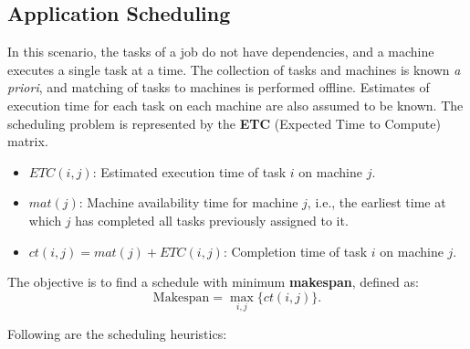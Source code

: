 \documentclass[12pt]{book}
\begin{document}
\subsection{Application Scheduling}
In this scenario, the tasks of a job do not have dependencies, and a machine executes a single task at a time. 
The collection of tasks and machines is known \emph{a priori}, and matching of tasks to machines is performed offline. 
Estimates of execution time for each task on each machine are also assumed to be known. 
The scheduling problem is represented by the \textbf{ETC} (Expected Time to Compute) matrix.  

\begin{itemize}
    \item $ETC(i,j)$: Estimated execution time of task $i$ on machine $j$.
    \item $mat(j)$: Machine availability time for machine $j$, i.e., the earliest time at which $j$ has completed all tasks previously assigned to it.
    \item $ct(i,j) = mat(j) + ETC(i,j)$: Completion time of task $i$ on machine $j$.
\end{itemize}

The objective is to find a schedule with minimum \textbf{makespan}, defined as:
\[
\text{Makespan} = \max_{i,j} \{ct(i,j)\}.
\]

Following are the scheduling heuristics:
\end{document}
